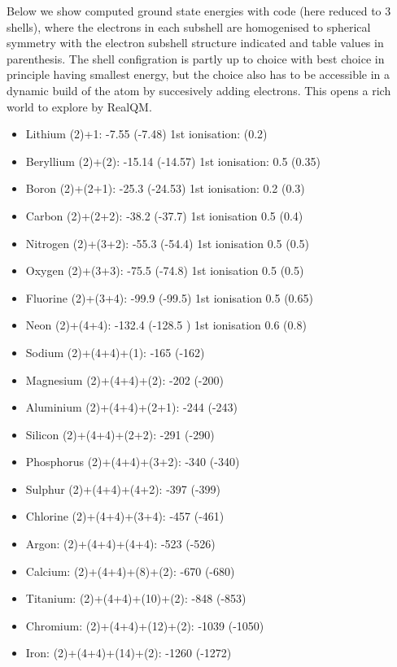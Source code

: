 \documentclass[11pt]{article} %
\begin{document}
Below we show computed ground state energies with code \cite{AtomSim} (here reduced to 3 shells),  where the electrons in each subshell are homogenised to spherical symmetry with the electron subshell structure indicated and table values in parenthesis. The shell configration is partly up to choice with best choice in principle having smallest energy,  but the choice also has to be accessible in a dynamic build of the atom by succesively adding electrons.  This opens a rich world to explore by RealQM.    
\begin{itemize}
\item Lithium (2)+1: -7.55 (-7.48)                  1st ionisation:      (0.2)
\item Beryllium (2)+(2): -15.14 (-14.57)           1st ionisation: 0.5 (0.35)
\item Boron (2)+(2+1): -25.3 (-24.53)               1st ionisation: 0.2 (0.3)
\item Carbon (2)+(2+2): -38.2  (-37.7)               1st ionisation 0.5 (0.4)
\item Nitrogen (2)+(3+2):  -55.3 (-54.4)            1st ionisation  0.5  (0.5)
\item Oxygen (2)+(3+3): -75.5 (-74.8)               1st ionisation  0.5  (0.5)
\item Fluorine (2)+(3+4):  -99.9   (-99.5)            1st ionisation  0.5      (0.65)
\item Neon (2)+(4+4):   -132.4     (-128.5  )        1st ionisation 0.6        (0.8)
\item Sodium (2)+(4+4)+(1): -165 (-162)
\item Magnesium (2)+(4+4)+(2): -202  (-200)
\item Aluminium (2)+(4+4)+(2+1): -244 (-243)
\item Silicon (2)+(4+4)+(2+2): -291 (-290)
\item Phosphorus (2)+(4+4)+(3+2): -340 (-340)
\item Sulphur (2)+(4+4)+(4+2): -397 (-399)
\item Chlorine (2)+(4+4)+(3+4): -457 (-461)
\item Argon: (2)+(4+4)+(4+4): -523 (-526)
\item Calcium: (2)+(4+4)+(8)+(2): -670 (-680)
\item Titanium: (2)+(4+4)+(10)+(2): -848 (-853)
\item Chromium: (2)+(4+4)+(12)+(2): -1039 (-1050)
\item Iron: (2)+(4+4)+(14)+(2): -1260 (-1272)

\end{itemize}
\end{document}
